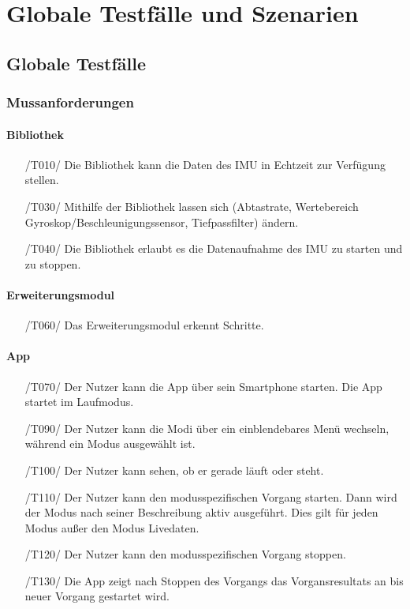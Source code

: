 \documentclass[a4paper,12pt]{article}
\begin{document}
\section{Globale Testfälle und Szenarien}
  \subsection{Globale Testfälle}
  \subsubsection{Mussanforderungen}
  \paragraph{Bibliothek}
  \begin{itemize}
    \item[/T010/] Die Bibliothek kann die Daten des \Gls{IMU} in \Gls{Echtzeit} zur Verfügung stellen.
    \item[/T030/] Mithilfe der Bibliothek lassen sich (Abtastrate, Wertebereich Gyroskop/Beschleunigungssensor, Tiefpassfilter) ändern. 
    \item[/T040/] Die Bibliothek erlaubt es die Datenaufnahme des \Gls{IMU} zu starten und zu stoppen.
  \end{itemize}
  \paragraph{Erweiterungsmodul}
  \begin{itemize}
    \item[/T060/] Das Erweiterungsmodul erkennt Schritte.
  \end{itemize}
  \paragraph{App}
    \begin{itemize}
    \item[/T070/] Der Nutzer kann die App über sein Smartphone starten. Die App startet im Laufmodus.
    \item[/T090/] Der Nutzer kann die Modi über ein einblendebares Menü wechseln, während ein Modus ausgewählt ist.
    \item[/T100/] Der Nutzer kann sehen, ob er gerade \glqq läuft\grqq{} oder \glqq steht\grqq{}.
    \item[/T110/] Der Nutzer kann den modusspezifischen \Gls{Vorgang} starten. Dann wird der Modus nach seiner Beschreibung aktiv ausgeführt. Dies gilt für jeden Modus außer den Modus \glqq Livedaten\grqq.
    \item[/T120/] Der Nutzer kann den modusspezifischen \Gls{Vorgang} stoppen.
    \item[/T130/] Die App zeigt nach Stoppen des Vorgangs das Vorgansresultats an bis neuer \Gls{Vorgang} gestartet wird.
  \end{itemize}
\end{document}
